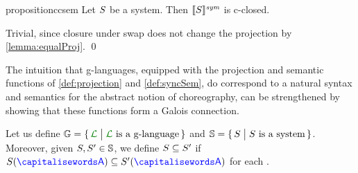 \begin{restatable}{proposition}{ccsem}\label{prop:par}
  Let $S$ be a system. Then ${\llbracket S \rrbracket^{\textit{sym}}}$ is
  c-closed.
\end{restatable}
\begin{toappendix}
  \ccsem*
\end{toappendix}
\begin{appendixproof}
  Trivial, since closure under swap does not change the projection by
  \cref{lemma:equalProj}.
  \qed
\end{appendixproof}



The intuition that g-languages, equipped with the projection and
semantic functions of \cref{def:projection} and \cref{def:syncSem}, do
correspond to a natural syntax and semantics for the abstract notion
of choreography, can be strengthened by showing that these functions
form a Galois connection.

Let us define
$\glanguages = \Set{\clang \sst \clang \text{ is a g-language}}$ and
$\mathbb{S} = \{\,S \;\big|\; S \text{ is a system}\,\}$.
%
Moreover, given $S, S' \in \mathbb{S}$, we define
$S\subseteq S'$ if $\aCS(\p)\subseteq \aCS'(\p)$ for each \p.

